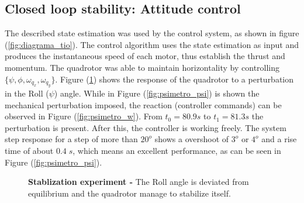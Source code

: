 \documentclass[conference]{IEEEtran}
\newcommand{\refp}[1]{(\ref{#1})}
\begin{document}
\subsection{Closed loop stability: Attitude control}
The described state estimation was used by the control system, as shown in figure \refp{fig:diagrama_tio}. The control algorithm uses the state estimation as input and produces the instantaneous speed of each motor, thus establish the thrust and momentum.
The quadrotor was able to maintain horizontality by controlling $\{\psi,\phi,\omega_{q_x},\omega_{q_y}\}$. 
Figure \refp{fig:psimetro} shows the response of the quadrotor to a perturbation in the Roll ($\psi$) angle. While in Figure \refp{fig:psimetro_psi} is shown the mechanical perturbation imposed, the reaction (controller commands) can be observed in Figure \refp{fig:psimetro_w}. From $t_0 = 80.9 s$ to $t_1 =81.3 s$ the perturbation is present. After this, the controller is working freely. The system step response for a step of more than $20^o$ shows a overshoot of $3^o$ or $4^o$ and a rise time of about $0.4\;s$, which means an excellent performance, as can be seen in Figure \refp{fig:psimetro_psi}.
\begin{figure}[t]
  \centering
   \hspace*{-5pt}
  \caption{\textbf{Stablization experiment -} The Roll angle is deviated from equilibrium and the quadrotor manage to stabilize itself.}
  \label{fig:psimetro}
  \vspace{-0.5cm}
\end{figure}
\end{document}

